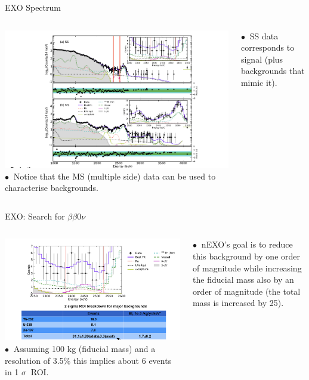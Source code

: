 \documentclass [aspectratio=169]{beamer}
\newcommand{\bbonu}{\ensuremath{\beta\beta0\nu}}
\begin{document}
\begin{frame}{EXO Spectrum}
\begin{columns}
\includegraphics[scale=0.40]{exo-spectrum.tex}
$\bullet~$ Notice that the MS (multiple side) data can be used to characterise backgrounds.  

$\bullet~$ SS data corresponds to signal (plus backgrounds that mimic it).   

\end{columns}
\end{frame}

\begin{frame}{EXO: Search for \bbonu}
\begin{columns}
\includegraphics[scale=0.35]{exo-fit.png}
$\bullet~$ Assuming 100 kg (fiducial mass) and a resolution of 3.5\% this implies about 6 events in
1 $\sigma~$ ROI.   

$\bullet~$ nEXO's goal is to reduce this background by one order of magnitude while increasing the fiducial mass also by an order of magnitude (the total mass is increased by 25).    

\end{columns}
\end{frame}
\end{document}
